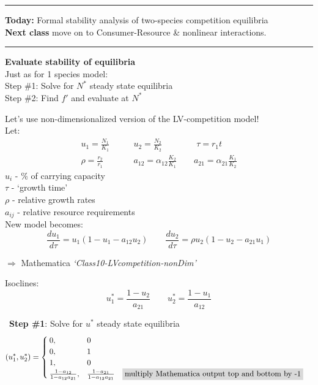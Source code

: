 \documentclass{article}
\newcommand{\note}[1]{\colorbox{gray!30}{#1}}
\newcommand{\ind}{\-\hspace{1cm}}
\begin{document}
\noindent{}
\rule[0.5ex]{\linewidth}{1pt}
\textbf{Today:} 
\ind Formal stability analysis of two-species competition equilibria\\
\textbf{Next class} move on to Consumer-Resource \& nonlinear interactions.

\rule[0.5ex]{\linewidth}{1pt}

\textbf{Evaluate stability of equilibria} \\
Just as for 1 species model:\\
\ind Step \#1: Solve for $N^*$ steady state equilibria\\
\ind Step \#2: Find $f'$ and evaluate at $N^*$

Let's use non-dimensionalized version of the LV-competition model!\\
Let:
\begin{align*}
	u_1 = \frac{N_1}{K_1} \quad & \quad u_2 = \frac{N_2}{K_2} \quad  \quad \quad \quad \tau = r_1 t\\
	\rho = \frac{r_2}{r_1} \quad & \quad a_{12}=\alpha_{12}\frac{K_2}{K_1} \quad \quad a_{21}=\alpha_{21}\frac{K_1}{K_2} 
\end{align*}
\ind $u_i$ - \% of carrying capacity\\
\ind $\tau$ - `growth time'\\
\ind $\rho$ - relative growth rates\\
\ind $a_{ij}$ - relative resource requirements\\


New model becomes:
\begin{equation*}
	\frac{d u_1}{d\tau}=u_1(1-u_1 - a_{12}u_2) \quad \quad \frac{d u_2}{d\tau}=\rho u_2(1-u_2 - a_{21}u_1)
\end{equation*}

\note{$\Rightarrow$ Mathematica \emph{`Class10-LVcompetition-nonDim'}}
\vspace{0.5cm}

Isoclines:
\begin{equation*}
	u_1^*=\frac{1-u_2}{a_{21}} \quad \quad u_2^*=\frac{1-u_1}{a_{12}}
\end{equation*}

\
\textbf{Step \#1}: Solve for $u^*$ steady state equilibria
\begin{align*}
(u_1^*,u_2^*)& =
\begin{cases}
	 0 , & 0  \\
	0, & 1  \\
	1, & 0\\
	\frac{1-a_{12}}{1- a_{12} a_{21} }, & \frac{1-a_{21}}{1- a_{12} a_{21} } \quad \text{\note{multiply 
	Mathematica output top and bottom by -1}}
\end{cases}
\end{align*}
\end{document}
